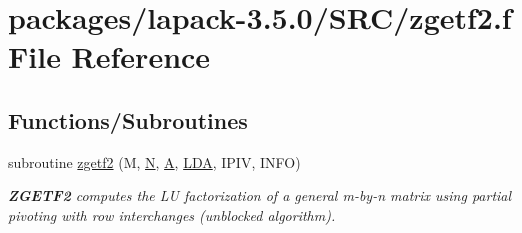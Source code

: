 \hypertarget{zgetf2_8f}{}\section{packages/lapack-\/3.5.0/\+S\+R\+C/zgetf2.f File Reference}
\label{zgetf2_8f}
\subsection*{Functions/\+Subroutines}
\begin{DoxyCompactItemize}
\item 
subroutine \hyperlink{group__complex16GEcomputational_gaf3c2645d2b9b3d3bc26fcd9ad463cd5e}{zgetf2} (M, \hyperlink{polmisc_8c_a0240ac851181b84ac374872dc5434ee4}{N}, \hyperlink{classA}{A}, \hyperlink{example__user_8c_ae946da542ce0db94dced19b2ecefd1aa}{L\+D\+A}, I\+P\+I\+V, I\+N\+F\+O)
\begin{DoxyCompactList}\small\item\em {\bfseries Z\+G\+E\+T\+F2} computes the L\+U factorization of a general m-\/by-\/n matrix using partial pivoting with row interchanges (unblocked algorithm). \end{DoxyCompactList}\end{DoxyCompactItemize}
